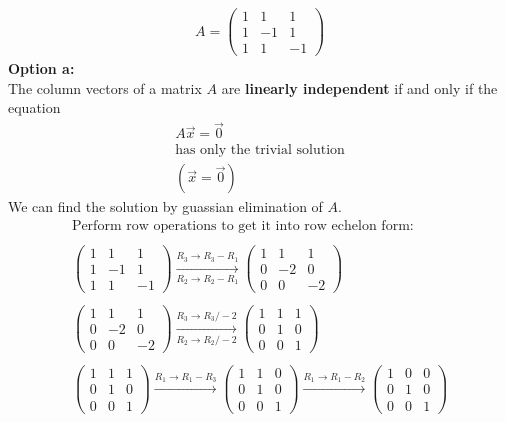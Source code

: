 \documentclass[journal]{IEEEtran}
\begin{document}
\begin{align}
A = \begin{pmatrix}1 & 1 & 1 \\1 & -1 & 1 \\1 & 1 & -1\end{pmatrix}
\end{align}
\textbf{Option a:}\\
The column vectors of a matrix $A$ are \textbf{linearly independent} if and only if the equation
\begin{align}
A\vec{x} = \vec{0}\\
\text{has only the trivial solution}\\
(\vec{x} = \vec{0})
\end{align}
We can find the solution by guassian elimination of $A$.
\begin{align}
\text{Perform row operations to get it into row echelon form:}\\\\
\begin{pmatrix}1 & 1 & 1 \\1 & -1 & 1 \\1 & 1 & -1\end{pmatrix}\xrightarrow[
R_2 \to R_2 - R_1]{R_3 \to R_3 - R_1}
    \begin{pmatrix} 1 & 1 & 1 \\ 0 & -2 & 0 \\ 0 & 0 & -2 \end{pmatrix}\\\\
\begin{pmatrix} 1 & 1 & 1 \\ 0 & -2 & 0 \\ 0 & 0 & -2 \end{pmatrix}\xrightarrow[
R_2 \to R_2 / -2]{R_3 \to R_3 / -2}
    \begin{pmatrix} 1 & 1 & 1 \\ 0 & 1 & 0 \\ 0 & 0 & 1 \end{pmatrix}\\\\
 \begin{pmatrix} 1 & 1 & 1 \\ 0 & 1 & 0 \\ 0 & 0 & 1 \end{pmatrix}\xrightarrow{
    R_1 \to R_1 - R_3}
    \begin{pmatrix} 1 & 1 & 0 \\ 0 & 1 & 0 \\ 0 & 0 & 1 \end{pmatrix}\xrightarrow{  R_1 \to R_1 - R_2}
    \begin{pmatrix} 1 & 0 & 0 \\ 0 & 1 & 0 \\ 0 & 0 & 1 \end{pmatrix}
    \end{align}\\
\end{document}
